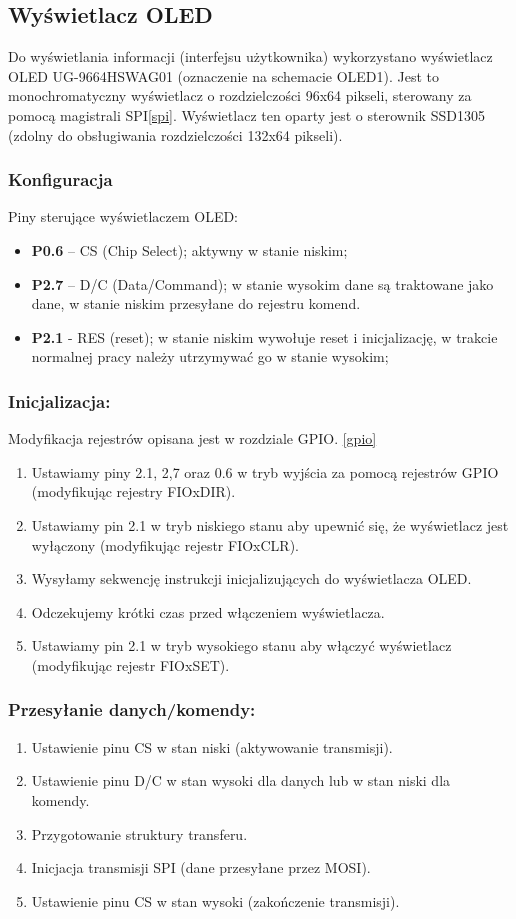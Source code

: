 \subsection{Wyświetlacz OLED}

Do wyświetlania informacji (interfejsu użytkownika) wykorzystano wyświetlacz OLED UG-9664HSWAG01 (oznaczenie na schemacie OLED1). Jest to monochromatyczny wyświetlacz o rozdzielczości 96x64 pikseli, sterowany za pomocą magistrali SPI\ref{spi}. Wyświetlacz ten oparty jest o sterownik SSD1305 (zdolny do obsługiwania rozdzielczości 132x64 pikseli).

\subsubsection{Konfiguracja}
Piny sterujące wyświetlaczem OLED:
\begin{itemize}
\item \textbf{P0.6} – CS (Chip Select); aktywny w stanie niskim;
\item \textbf{P2.7} – D/C (Data/Command); w stanie wysokim dane są traktowane jako dane, w stanie niskim przesyłane do rejestru komend.
\item \textbf{P2.1} - RES (reset); w stanie niskim wywołuje reset i inicjalizację, w trakcie normalnej pracy należy utrzymywać go w stanie wysokim;
\end{itemize}
\subsubsection {Inicjalizacja:}
Modyfikacja rejestrów opisana jest w rozdziale GPIO. \ref{gpio}
\begin{enumerate}
    \item Ustawiamy piny 2.1, 2,7 oraz 0.6 w tryb wyjścia za pomocą rejestrów GPIO (modyfikując rejestry FIOxDIR).
    \item Ustawiamy pin 2.1 w tryb niskiego stanu aby upewnić się, że wyświetlacz jest wyłączony (modyfikując rejestr FIOxCLR).
    \item Wysyłamy sekwencję instrukcji inicjalizujących do wyświetlacza OLED.
    \item Odczekujemy krótki czas przed włączeniem wyświetlacza.
    \item Ustawiamy pin 2.1 w tryb wysokiego stanu aby włączyć wyświetlacz (modyfikując rejestr FIOxSET).
\end{enumerate}
\subsubsection {Przesyłanie danych/komendy:}
\label{przes}
\begin{enumerate}
    \item Ustawienie pinu CS w stan niski (aktywowanie transmisji).
    \item Ustawienie pinu D/C w stan wysoki dla danych lub w stan niski dla komendy.
    \item Przygotowanie struktury transferu.
    \item Inicjacja transmisji SPI (dane przesyłane przez MOSI). 
    \item Ustawienie pinu CS w stan wysoki (zakończenie transmisji).
\end{enumerate}


